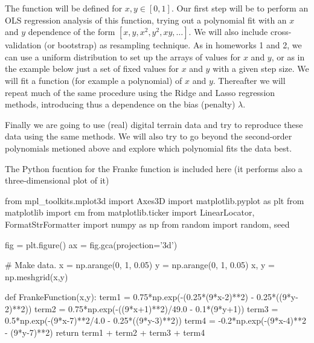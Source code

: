 \documentclass[%
oneside,                 %
final,                   %
10pt]{article}
\begin{document}
The function will be defined for $x,y\in [0,1]$.  Our first step will
be to perform an OLS regression analysis of this function, trying out
a polynomial fit with an $x$ and $y$ dependence of the form $[x, y,
x^2, y^2, xy, \dots]$. We will also include cross-validation (or bootstrap) as
resampling technique.  As in homeworks 1 and 2, we can use a uniform
distribution to set up the arrays of values for $x$ and $y$, or as in
the example below just a set of fixed 
values for $x$ and $y$ with a given step
size.  We will fit a
function (for example a polynomial) of $x$ and $y$.  Thereafter we
will repeat much of the same procedure using the Ridge and Lasso
regression methods, introducing thus a dependence on the bias
(penalty) $\lambda$.

Finally we are going to use (real) digital terrain data and try to
reproduce these data using the same methods. We will also try to go
beyond the second-order polynomials metioned above and explore 
which polynomial fits the data best.

The Python fucntion for the Franke function is included here (it performs also a three-dimensional plot of it)









































\bpycod
from mpl_toolkits.mplot3d import Axes3D
import matplotlib.pyplot as plt
from matplotlib import cm
from matplotlib.ticker import LinearLocator, FormatStrFormatter
import numpy as np
from random import random, seed

fig = plt.figure()
ax = fig.gca(projection='3d')

# Make data.
x = np.arange(0, 1, 0.05)
y = np.arange(0, 1, 0.05)
x, y = np.meshgrid(x,y)


def FrankeFunction(x,y):
    term1 = 0.75*np.exp(-(0.25*(9*x-2)**2) - 0.25*((9*y-2)**2))
    term2 = 0.75*np.exp(-((9*x+1)**2)/49.0 - 0.1*(9*y+1))
    term3 = 0.5*np.exp(-(9*x-7)**2/4.0 - 0.25*((9*y-3)**2))
    term4 = -0.2*np.exp(-(9*x-4)**2 - (9*y-7)**2)
    return term1 + term2 + term3 + term4
\end{document}
